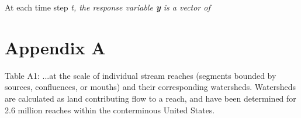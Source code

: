 \documentclass{article}
\begin{document}
At each time step \it{t}, the response variable \textbf{y} is a vector of



\section*{Appendix A}
Table A1:
...at the scale of individual stream reaches (segments bounded by sources, confluences, or mouths) and their corresponding watersheds. Watersheds are calculated as land contributing flow to a reach, and have been determined for 2.6 million reaches within the conterminous United States.
\end{document}
